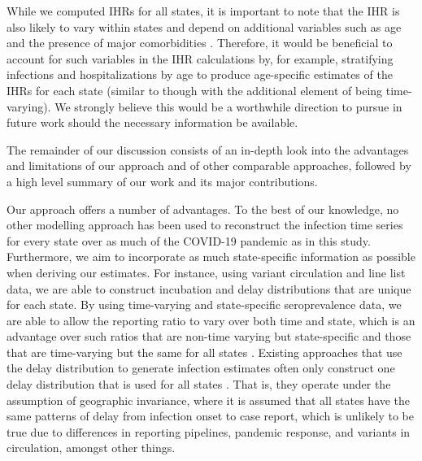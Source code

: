 \documentclass{article}
\begin{document}
While we computed IHRs for all states, it is important to note that the IHR is
 also likely to vary within states and depend on additional variables such as
 age and the presence of major comorbidities \citep{russell2023comorbidities}.
 Therefore, it would be beneficial to account for such variables in the IHR
 calculations by, for example, stratifying infections and hospitalizations by
 age to produce age-specific estimates of the IHRs for each state (similar to
 \citealp{fox2023disproportionate} though with the additional element of being
 time-varying). We strongly believe this would be a worthwhile direction to
 pursue in future work should the necessary information be available. 

The remainder of our discussion consists of an in-depth look into the advantages and
limitations of our approach and of other comparable approaches, followed by a
high level summary of our work and its major contributions. 

Our approach offers a number of advantages.
To the best of our knowledge, no other modelling approach has been used to 
reconstruct the infection time series
for every state over as much of the COVID-19 pandemic as in this study.
Furthermore, we aim to incorporate as much state-specific information as
possible when deriving our estimates. For instance, using variant circulation
and line list data, we are able to construct incubation and delay distributions
that are unique for each state. By using time-varying and state-specific
seroprevalence data, we are able to allow the reporting ratio to vary over both
time and state, which is an advantage over such ratios that are non-time varying
but state-specific and those that are time-varying but the same for all states
\citep{unwin2020state, uga2020covid19}. 
Existing approaches that use the delay distribution to generate infection
estimates often only construct one delay distribution that is used for all
states \citep{chitwood2022reconstructing, jahja2022real}. That is, they operate
under the assumption of geographic invariance, where it is assumed that all
states have the same patterns of delay from infection onset to case report,
which is unlikely to be true due to differences in reporting pipelines, pandemic
response, and variants in circulation, amongst other things. 
\end{document}
